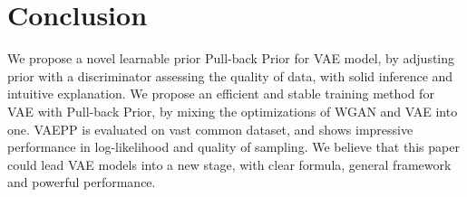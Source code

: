 \section{Conclusion}

We propose a novel learnable prior Pull-back Prior for VAE model, by adjusting prior with a discriminator assessing the quality of data, with solid inference and intuitive explanation. We propose an efficient and stable training method for VAE with Pull-back Prior, by mixing the optimizations of WGAN and VAE into one. VAEPP is evaluated on vast common dataset, and shows impressive performance in log-likelihood and quality of sampling. We believe that this paper could lead VAE models into a new stage, with clear formula, general framework and powerful performance. 